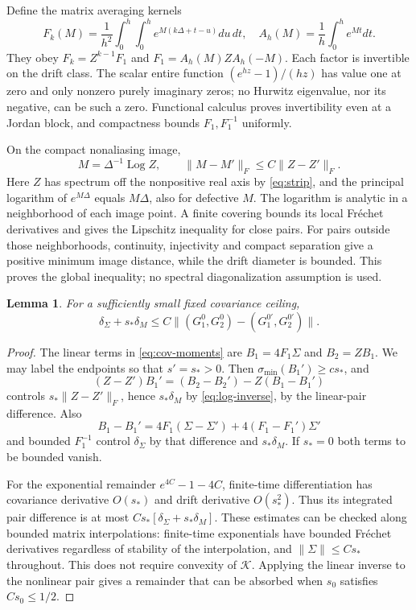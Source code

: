 \documentclass[11pt,a4paper]{amsart}
\theoremstyle{plain}
\newtheorem{lemma}[theorem]{Lemma}
\theoremstyle{definition}
\theoremstyle{remark}
\DeclareMathOperator{\Log}{Log}
\begin{document}
Define the matrix averaging kernels
\begin{equation}\label{eq:averaging}
 F_k(M)=\frac1{h^2}\int_0^h\!\int_0^h
                  e^{M(k\Delta+t-u)}du\,dt,
 \quad A_h(M)=\frac1h\int_0^h e^{Mt}dt.
\end{equation}
They obey $F_k=Z^{k-1}F_1$ and
$F_1=A_h(M)ZA_h(-M)$. Each factor is invertible on the drift class. The
scalar entire function $(e^{hz}-1)/(hz)$ has value one at zero and only
nonzero purely imaginary zeros; no Hurwitz eigenvalue, nor its negative,
can be such a zero. Functional calculus proves invertibility even at a
Jordan block, and compactness bounds $F_1,F_1^{-1}$ uniformly.

On the compact nonaliasing image,
\begin{equation}\label{eq:log-inverse}
 M=\Delta^{-1}\Log Z,\qquad \|M-M'\|_F\le C\|Z-Z'\|_F.
\end{equation}
Here $Z$ has spectrum off the nonpositive real axis by
\eqref{eq:strip}, and the principal logarithm of $e^{M\Delta}$ equals
$M\Delta$, also for defective $M$. The logarithm is analytic in a
neighborhood of each image point. A finite covering bounds its local
Fr\'echet derivatives and gives the Lipschitz inequality for close pairs.
For pairs outside those neighborhoods, continuity, injectivity and compact
separation give a positive minimum image distance, while the drift
diameter is bounded. This proves the global inequality; no spectral
diagonalization assumption is used.

\begin{lemma}\label{lem:cov-inverse}
For a sufficiently small fixed covariance ceiling,
\begin{equation}\label{eq:cov-inverse}
 \delta_\Sigma+s_*\delta_M
 \le C\|(G_1^0,G_2^0)-(G_1^{0\prime},G_2^{0\prime})\|.
\end{equation}
\end{lemma}
\begin{proof}
The linear terms in \eqref{eq:cov-moments} are
$B_1=4F_1\Sigma$ and $B_2=ZB_1$. We may label the endpoints so that
$s'=s_*>0$. Then $\sigma_{\min}(B_1')\ge c s_*$, and
\[
 (Z-Z')B_1'=(B_2-B_2')-Z(B_1-B_1')
\]
controls $s_*\|Z-Z'\|_F$, hence $s_*\delta_M$ by
\eqref{eq:log-inverse}, by the linear-pair difference. Also
\[
 B_1-B_1'=4F_1(\Sigma-\Sigma')+4(F_1-F_1')\Sigma'
\]
and bounded $F_1^{-1}$ control $\delta_\Sigma$ by that difference and
$s_*\delta_M$. If $s_*=0$ both terms to be bounded vanish.

For the exponential remainder $e^{4C}-1-4C$, finite-time differentiation
has covariance derivative $O(s_*)$ and drift derivative $O(s_*^2)$.
Thus its integrated pair difference is at most
$Cs_*[\delta_\Sigma+s_*\delta_M]$. These estimates can be checked along
bounded matrix interpolations: finite-time exponentials have bounded
Fr\'echet derivatives regardless of stability of the interpolation, and
$\|\Sigma\|\le Cs_*$ throughout. This does not require convexity of
$\mathcal K$. Applying the linear inverse to the nonlinear pair gives a
remainder that can be absorbed when $s_0$ satisfies $Cs_0\le1/2$.
\end{proof}
\end{document}
